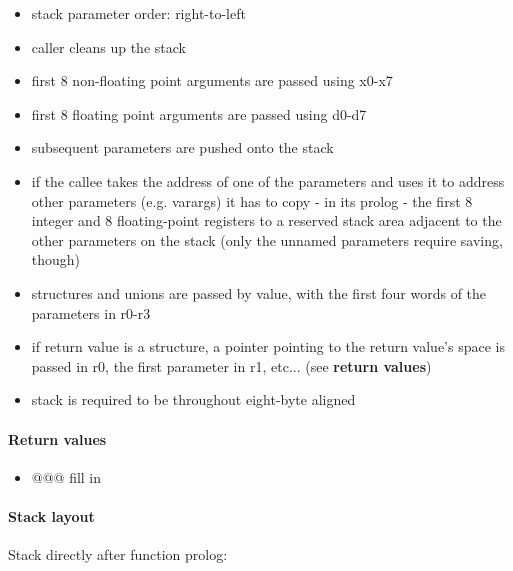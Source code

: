 \begin{itemize}
\item stack parameter order: right-to-left
\item caller cleans up the stack
\item first 8 non-floating point arguments are passed using x0-x7
\item first 8 floating point arguments are passed using d0-d7
\item subsequent parameters are pushed onto the stack
\item if the callee takes the address of one of the parameters and uses it to address other parameters (e.g. varargs) it has to copy - in its prolog - the first 8 integer and 8 floating-point registers to a reserved stack area adjacent to the other parameters on the stack (only the unnamed parameters require saving, though)
\item structures and unions are passed by value, with the first four words of the parameters in r0-r3
\item if return value is a structure, a pointer pointing to the return value's space is passed in r0, the first parameter in r1, etc... (see {\bf return values})
\item stack is required to be throughout eight-byte aligned
\end{itemize}

\paragraph{Return values}
\begin{itemize}
\item @@@ fill in
\end{itemize}

\paragraph{Stack layout}

Stack directly after function prolog:\\

